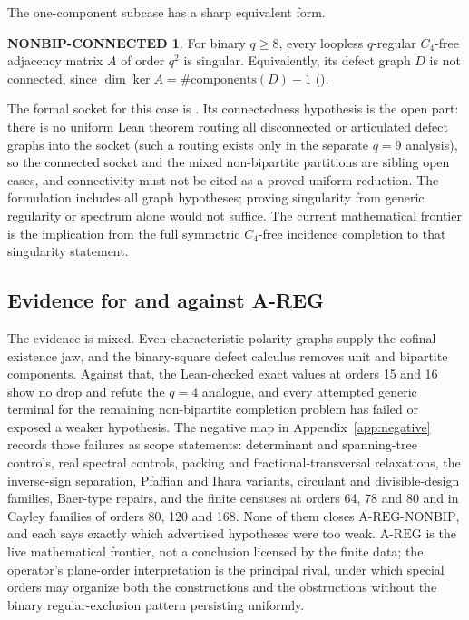 \documentclass{anvil-paper}
\newcommand{\AREG}{\mathrm{A\text{-}REG}}
\newcommand{\NONBIP}{\mathrm{A\text{-}REG\text{-}NONBIP}}
\theoremstyle{definition}
\newtheorem*{nonbipconn}{NONBIP-CONNECTED}
\begin{document}
The one-component subcase has a sharp equivalent form.

\begin{nonbipconn}
For binary $q\ge 8$, every loopless $q$-regular $C_4$-free adjacency matrix $A$ of order $q^2$ is singular. Equivalently, its defect graph $D$ is not connected, since $\dim\ker A=\#\mathrm{components}(D)-1$ ().
\end{nonbipconn}

The formal socket for this case is . Its connectedness hypothesis is the open part: there is no uniform Lean theorem routing all disconnected or articulated defect graphs into the socket (such a routing exists only in the separate $q=9$ analysis), so the connected socket and the mixed non-bipartite partitions are sibling open cases, and connectivity must not be cited as a proved uniform reduction. The formulation includes all graph hypotheses; proving singularity from generic regularity or spectrum alone would not suffice. The current mathematical frontier is the implication from the full symmetric $C_4$-free incidence completion to that singularity statement.

\subsection{Evidence for and against A-REG}\label{sec:areg-evidence}

The evidence is mixed. Even-characteristic polarity graphs supply the cofinal existence jaw, and the binary-square defect calculus removes unit and bipartite components. Against that, the Lean-checked exact values at orders 15 and 16 show no drop and refute the $q=4$ analogue, and every attempted generic terminal for the remaining non-bipartite completion problem has failed or exposed a weaker hypothesis. The negative map in Appendix~\ref{app:negative} records those failures as scope statements: determinant and spanning-tree controls, real spectral controls, packing and fractional-transversal relaxations, the inverse-sign separation, Pfaffian and Ihara variants, circulant and divisible-design families, Baer-type repairs, and the finite censuses at orders 64, 78 and 80 and in Cayley families of orders 80, 120 and 168. None of them closes $\NONBIP$, and each says exactly which advertised hypotheses were too weak. $\AREG$ is the live mathematical frontier, not a conclusion licensed by the finite data; the operator's plane-order interpretation is the principal rival, under which special orders may organize both the constructions and the obstructions without the binary regular-exclusion pattern persisting uniformly.
\end{document}
